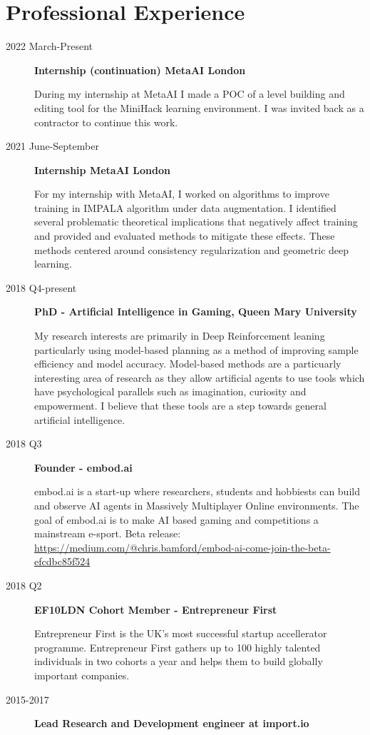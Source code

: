 \documentclass[a4paper]{article}
\begin{document}
\section{Professional Experience}\label{professional-experience}

\begin{description}

\item[2022 March-Present]
\textbf{Internship (continuation) MetaAI London}

During my internship at MetaAI I made a POC of a level building and editing tool for the MiniHack learning environment. I was invited back as a contractor to continue this work.

\item[2021 June-September]
\textbf{Internship MetaAI London}

For my internship with MetaAI, I worked on algorithms to improve training in IMPALA algorithm under data augmentation. I identified several problematic theoretical implications that negatively affect training and provided and evaluated methods to mitigate these effects. These methods centered around consistency regularization and geometric deep learning.

\item[2018 Q4-present]
\textbf{PhD - Artificial Intelligence in Gaming, Queen Mary University}

My research interests are primarily in Deep Reinforcement leaning
particularly using model-based planning as a method of improving sample
efficiency and model accuracy. Model-based methods are a particuarly
interesting area of research as they allow artificial agents to use
tools which have psychological parallels such as imagination, curiosity
and empowerment. I believe that these tools are a step towards general
artificial intelligence.
\item[2018 Q3]
\textbf{Founder - embod.ai}

embod.ai is a start-up where researchers, students and hobbiests can
build and observe AI agents in Massively Multiplayer Online
environments. The goal of embod.ai is to make AI based gaming and
competitions a mainstream e-sport. Beta release:
\url{https://medium.com/@chris.bamford/embod-ai-come-join-the-beta-efcdbc85f524}

\item[2018 Q2]
\textbf{EF10LDN Cohort Member - Entrepreneur First}

Entrepreneur First is the UK's most successful startup accellerator
programme. Entrepreneur First gathers up to 100 highly talented
individuals in two cohorts a year and helps them to build globally
important companies.
\item[2015-2017]
\textbf{Lead Research and Development engineer at import.io}


\end{description}
\end{document}
